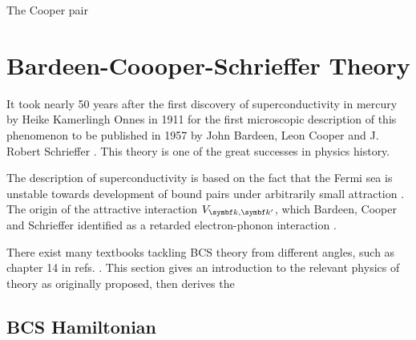 \documentclass[../notes.tex]{subfiles}
\begin{document}
The Cooper pair \cite{yuanSupercurrentDiodeEffect2022, shimanoHiggsModeSuperconductors2020}






\section{Bardeen-Coooper-Schrieffer Theory}\label{sec:bcs-theory}

It took nearly 50 years after the first discovery of superconductivity in mercury by Heike Kamerlingh Onnes in 1911 \cite{onnesFurtherExperimentsLiquid1991} for the first microscopic description of this phenomenon to be published in 1957 by John Bardeen, Leon Cooper and J. Robert Schrieffer \cite{bardeenTheorySuperconductivity1957}.
This  theory is one of the great successes in physics history.

The  description of superconductivity is based on the fact that the Fermi sea is unstable towards development of bound pairs under arbitrarily small attraction \cite{cooperBoundElectronPairs1956}.
The origin of the attractive interaction \(V_{{\vb{k}, \vb{k}^{\prime}}}\), which Bardeen, Cooper and Schrieffer identified as a retarded electron-phonon interaction \cite{bardeenTheorySuperconductivity1957}.

There exist many textbooks tackling BCS theory from different angles, such as chapter 14 in refs. \cite{colemanIntroductionManyBodyPhysics2015, tinkhamIntroductionSuperconductivity1996}.
This section gives an introduction to the relevant physics of  theory as originally proposed, then derives the 


\subsection{BCS Hamiltonian}

\end{document}
